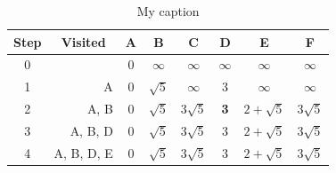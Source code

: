 \begin{enumerate}
\begin{table}[]
	\centering
	\caption{My caption}
	\label{my-label}
	\begin{tabular}{|c|r|c|c|c|c|c|c|}
		\hline
		\rowcolor[HTML]{FCFF2F} 
		\cellcolor[HTML]{C0C0C0}\textbf{Step} & \multicolumn{1}{c|}{\cellcolor[HTML]{C0C0C0}\textbf{Visited}} & \textbf{A}                         & \textbf{B}                                & \textbf{C}                                 & \textbf{D}                         & \textbf{E}                                  & \textbf{F}                                 \\ \hline
		0                                     &                                                               & 0                                  & $\infty$                                  & $\infty$                                   & $\infty$                           & $\infty$                                    & $\infty$                                   \\ \hline
		1                                     & A                                                             & 0                                  & \textbf{$\sqrt5$}                         & $\infty$                                   & 3                                  & $\infty$                                    & $\infty$                                   \\ \hline
		2                                     & A, B                                                          & 0                                  & $\sqrt5$                                  & $3\sqrt5$                                  & \textbf{3}                         & $2+\sqrt5$                                  & $3\sqrt5$                                  \\ \hline
		3                                     & A, B, D                                                       & 0                                  & $\sqrt5$                                  & $3\sqrt5$                                  & 3                                  & \textbf{$2+\sqrt5$}                         & $3\sqrt5$                                  \\ \hline
		4                                     & A, B, D, E                                                    & 0                                  & $\sqrt5$                                  & $3\sqrt5$                                  & 3                                  & $2+\sqrt5$                                  & \textbf{$3\sqrt5$}                         \\ \hline

\end{tabular}
\end{table}
\end{enumerate}

